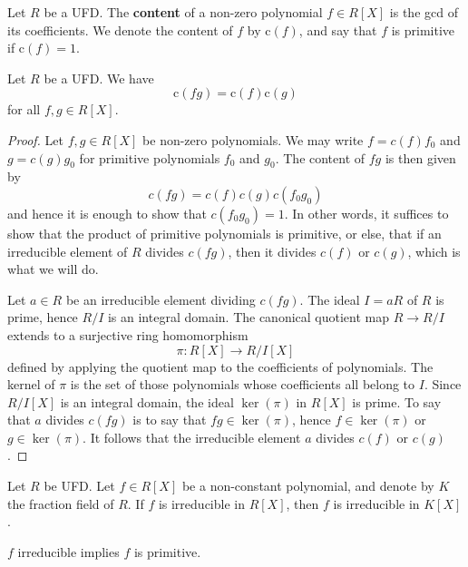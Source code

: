 \documentclass[12pt, a4paper]{article}
\begin{document}
\begin{definition}
    Let \(R\) be a UFD. The \textbf{content} of a non-zero polynomial \(f \in R[X]\) is the gcd of its coefficients. We denote the content of \(f\) by \(\text{c}(f)\), and say that \(f\) is primitive if \(\text{c}(f)=1\).
\end{definition}

\begin{lemma}
    Let \(R\) be a UFD. We have 
    \[\text{c}(fg)=\text{c}(f)\text{c}(g)\]
    for all \(f,g \in R[X]\).
\end{lemma}

\begin{proof}
    Let \( f, g \in R[X] \) be non-zero polynomials. We may write \( f = c(f)f_0 \) and \( g = c(g)g_0 \) for primitive polynomials \( f_0 \) and \( g_0 \). The content of \( fg \) is then given by
    \[
    c(fg) = c(f)c(g)c(f_0g_0)
    \]
    and hence it is enough to show that \( c(f_0g_0) = 1 \). In other words, it suffices to show that the product of primitive polynomials is primitive, or else, that if an irreducible element of \( R \) divides \( c(fg) \), then it divides \( c(f) \) or \( c(g) \), which is what we will do.

    Let \( a \in R \) be an irreducible element dividing \( c(fg) \). The ideal \( I = aR \) of \( R \) is prime, hence \( R/I \) is an integral domain. The canonical quotient map \( R \to R/I \) extends to a surjective ring homomorphism
    \[
    \pi : R[X] \to R/I[X]
    \]
    defined by applying the quotient map to the coefficients of polynomials. The kernel of \( \pi \) is the set of those polynomials whose coefficients all belong to \( I \). Since \( R/I[X] \) is an integral domain, the ideal \( \ker(\pi) \) in \( R[X] \) is prime. To say that \( a \) divides \( c(fg) \) is to say that \( fg \in \ker(\pi) \), hence \( f \in \ker(\pi) \) or \( g \in \ker(\pi) \). It follows that the irreducible element \( a \) divides \( c(f) \) or \( c(g) \). 
\end{proof}

\begin{mdprop}
    Let \(R\) be UFD. Let \(f \in R[X]\) be a non-constant polynomial, and denote by \(K\) the fraction field of \(R\). If \(f\) is irreducible in \(R[X]\), then \(f\) is irreducible in \(K[X]\).
\end{mdprop}

\begin{mdnote}
    \(f\) irreducible implies \(f\) is primitive.
\end{mdnote}
\end{document}
